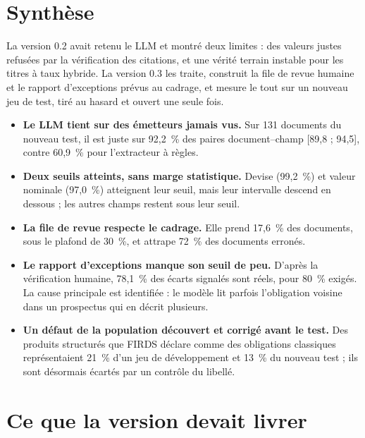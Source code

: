 \documentclass[11pt,a4paper]{article}
\begin{document}

\setcounter{tocdepth}{1}
\tableofcontents
\newpage

\section*{Synthèse}

La version 0.2 avait retenu le LLM et montré deux limites : des valeurs justes refusées par la vérification des citations, et une vérité terrain instable pour les titres à taux hybride. La version 0.3 les traite, construit la file de revue humaine et le rapport d'exceptions prévus au cadrage, et mesure le tout sur un nouveau jeu de test, tiré au hasard et ouvert une seule fois.

\begin{itemize}
  \item \textbf{Le LLM tient sur des émetteurs jamais vus.} Sur 131 documents du nouveau test, il est juste sur 92,2~\% des paires document--champ [89,8 ; 94,5], contre 60,9~\% pour l'extracteur à règles.
  \item \textbf{Deux seuils atteints, sans marge statistique.} Devise (99,2~\%) et valeur nominale (97,0~\%) atteignent leur seuil, mais leur intervalle descend en dessous ; les autres champs restent sous leur seuil.
  \item \textbf{La file de revue respecte le cadrage.} Elle prend 17,6~\% des documents, sous le plafond de 30~\%, et attrape 72~\% des documents erronés.
  \item \textbf{Le rapport d'exceptions manque son seuil de peu.} D'après la vérification humaine, 78,1~\% des écarts signalés sont réels, pour 80~\% exigés. La cause principale est identifiée : le modèle lit parfois l'obligation voisine dans un prospectus qui en décrit plusieurs.
  \item \textbf{Un défaut de la population découvert et corrigé avant le test.} Des produits structurés que FIRDS déclare comme des obligations classiques représentaient 21~\% d'un jeu de développement et 13~\% du nouveau test ; ils sont désormais écartés par un contrôle du libellé.
\end{itemize}

\section{Ce que la version devait livrer}
\end{document}
